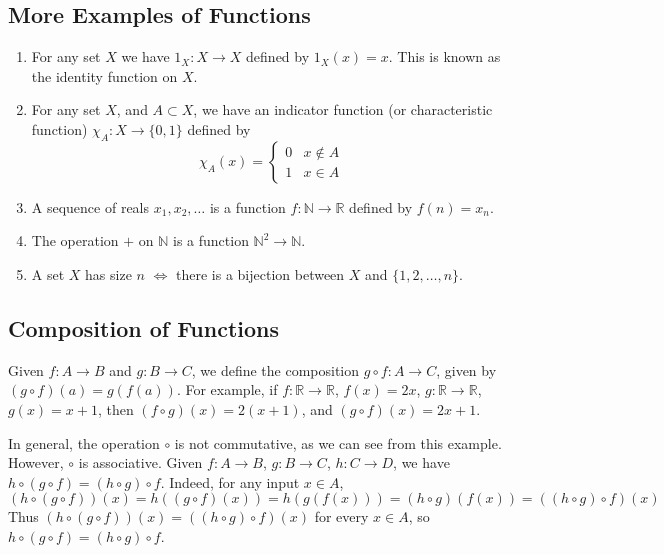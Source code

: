 \subsection{More Examples of Functions}
\begin{enumerate}
	\item For any set \(X\) we have \(1_X\colon X \to X\) defined by \(1_X(x) = x\).
	      This is known as the identity function on \(X\).
	\item For any set \(X\), and \(A \subset X\), we have an indicator function (or characteristic function) \(\chi_A\colon X \to \{ 0, 1 \}\) defined by
	      \[
		      \chi_A(x) = \begin{cases}
			      0 & x \notin A \\
			      1 & x \in A
		      \end{cases}
	      \]
	\item A sequence of reals \(x_1, x_2, \dots\) is a function \(f\colon \mathbb N \to \mathbb R\) defined by \(f(n) = x_n\).
	\item The operation \(+\) on \(\mathbb N\) is a function \(\mathbb N^2 \to \mathbb N\).
	\item A set \(X\) has size \(n\) \(\iff\) there is a bijection between \(X\) and \(\{ 1, 2, \dots, n \}\).
\end{enumerate}

\subsection{Composition of Functions}
Given \(f\colon A \to B\) and \(g\colon B \to C\), we define the composition \(g\circ f \colon A \to C\), given by \((g\circ f)(a) = g(f(a))\).
For example, if \(f\colon \mathbb R \to \mathbb R\), \(f(x) = 2x\), \(g\colon \mathbb R \to \mathbb R\), \(g(x) = x+1\), then \((f \circ g)(x) = 2(x+1)\), and \((g \circ f)(x) = 2x + 1\).

In general, the operation \(\circ\) is not commutative, as we can see from this example.
However, \(\circ\) is associative.
Given \(f\colon A \to B\), \(g\colon B \to C\), \(h\colon C \to D\), we have \(h \circ (g \circ f) = (h \circ g) \circ f\).
Indeed, for any input \(x \in A\),
\[
	(h \circ (g \circ f))(x) = h((g \circ f)(x)) = h(g(f(x))) = (h \circ g)(f(x)) = ((h \circ g)\circ f)(x)
\]
Thus \((h \circ (g \circ f))(x) = ((h \circ g)\circ f)(x)\) for every \(x \in A\), so \(h \circ (g \circ f) = (h \circ g)\circ f\).
